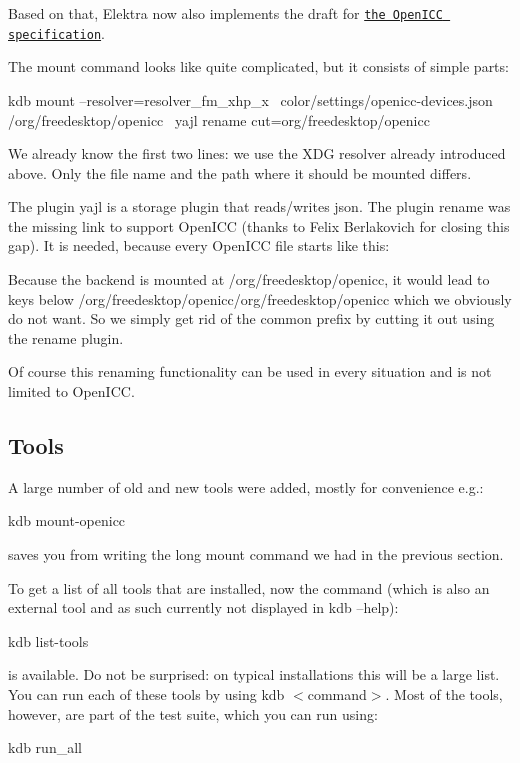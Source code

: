 Based on that, Elektra now also implements the draft for \href{https://www.openicc.info/index.php%3Ftitle=OpenICC_Configuration_0.1.html}{\tt the Open\+I\+CC specification}.

The mount command looks like quite complicated, but it consists of simple parts\+: \begin{DoxyVerb}kdb mount --resolver=resolver_fm_xhp_x \
  color/settings/openicc-devices.json /org/freedesktop/openicc \
  yajl rename cut=org/freedesktop/openicc
\end{DoxyVerb}


We already know the first two lines\+: we use the X\+DG resolver already introduced above. Only the file name and the path where it should be mounted differs.

The plugin yajl is a storage plugin that reads/writes json. The plugin rename was the missing link to support Open\+I\+CC (thanks to Felix Berlakovich for closing this gap). It is needed, because every Open\+I\+CC file starts like this\+: \begin{DoxyVerb}{ "org": { "freedesktop": { "openicc": {
\end{DoxyVerb}


Because the backend is mounted at /org/freedesktop/openicc, it would lead to keys below /org/freedesktop/openicc/org/freedesktop/openicc which we obviously do not want. So we simply get rid of the common prefix by cutting it out using the rename plugin.

Of course this renaming functionality can be used in every situation and is not limited to Open\+I\+CC.

\subsection*{Tools}

A large number of old and new tools were added, mostly for convenience e.\+g.\+: \begin{DoxyVerb}kdb mount-openicc
\end{DoxyVerb}


saves you from writing the long mount command we had in the previous section.

To get a list of all tools that are installed, now the command (which is also an external tool and as such currently not displayed in kdb --help)\+: \begin{DoxyVerb}kdb list-tools
\end{DoxyVerb}


is available. Do not be surprised\+: on typical installations this will be a large list. You can run each of these tools by using kdb $<$command$>$. Most of the tools, however, are part of the test suite, which you can run using\+: \begin{DoxyVerb}kdb run_all
\end{DoxyVerb}


